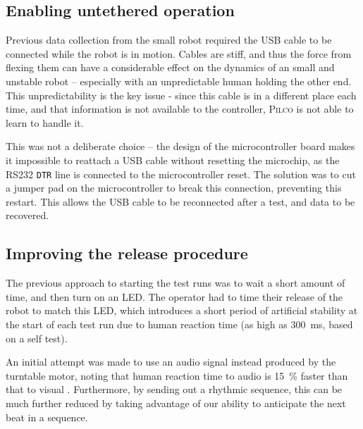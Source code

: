 \documentclass[main.tex]{subfiles}
\begin{document}
\subsection{Enabling untethered operation}
	\label{sec:untethered}

	Previous data collection from the small robot required the USB cable to be connected while the robot is in motion. Cables are stiff, and thus the force from flexing them can have a considerable effect on the dynamics of an small and unstable robot -- especially with an unpredictable human holding the other end. This unpredictability is the key issue - since this cable is in a different place each time, and that information is not available to the controller, \textsc{Pilco} is not able to learn to handle it.

	This was not a deliberate choice -- the design of the microcontroller board makes it impossible to reattach a USB cable without resetting the microchip, as the RS232 \texttt{DTR} line is connected to the microcontroller reset\footnotemark. The solution was to cut a jumper pad on the microcontroller to break this connection, preventing this restart. This allows the USB cable to be reconnected after a test, and data to be recovered.


\subsection{Improving the release procedure}
	\label{sec:switch}

	The previous approach to starting the test runs was to wait a short amount of time, and then turn on an LED.
	The operator had to time their release of the robot to match this LED, which introduces a short period of artificial stability at the start of each test run due to human reaction time (as high as \SI{300}{\milli\second}, based on a self test).

	An initial attempt was made to use an audio signal instead produced by the turntable motor, noting that human reaction time to audio is \SI{15}{\percent} faster than that to visual \cite{reaction}.
	Furthermore, by sending out a rhythmic sequence, this can be much further reduced by taking advantage of our ability to anticipate the next beat in a sequence.
\end{document}
